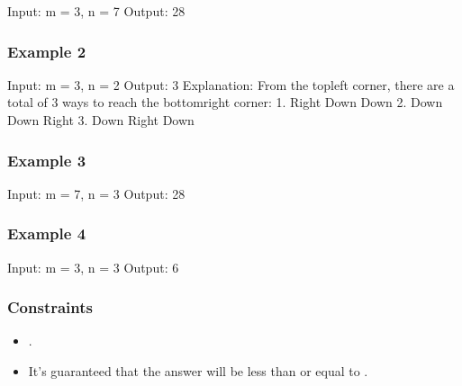 \documentclass[letterpaper,12pt,english]{book}
\begin{document}
\begin{sphinxVerbatim}[commandchars=\\\{\}]
Input: m = 3, n = 7
Output: 28
\end{sphinxVerbatim}


\subsubsection{Example 2}
\label{\detokenize{Dynamic_Programming/05_DP_62_Unique_Paths:example-2}}
\begin{sphinxVerbatim}[commandchars=\\\{\}]
Input: m = 3, n = 2
Output: 3
Explanation:
From the top\PYGZhy{}left corner, there are a total of 3 ways to reach the bottom\PYGZhy{}right corner:
1. Right \PYGZhy{}\PYGZgt{} Down \PYGZhy{}\PYGZgt{} Down
2. Down \PYGZhy{}\PYGZgt{} Down \PYGZhy{}\PYGZgt{} Right
3. Down \PYGZhy{}\PYGZgt{} Right \PYGZhy{}\PYGZgt{} Down
\end{sphinxVerbatim}


\subsubsection{Example 3}
\label{\detokenize{Dynamic_Programming/05_DP_62_Unique_Paths:example-3}}
\begin{sphinxVerbatim}[commandchars=\\\{\}]
Input: m = 7, n = 3
Output: 28
\end{sphinxVerbatim}


\subsubsection{Example 4}
\label{\detokenize{Dynamic_Programming/05_DP_62_Unique_Paths:example-4}}
\begin{sphinxVerbatim}[commandchars=\\\{\}]
Input: m = 3, n = 3
Output: 6
\end{sphinxVerbatim}


\subsubsection{Constraints}
\label{\detokenize{Dynamic_Programming/05_DP_62_Unique_Paths:constraints}}\begin{itemize}
\item {} 
\sphinxAtStartPar
{}.

\item {} 
\sphinxAtStartPar
It’s guaranteed that the answer will be less than or equal to .

\end{itemize}
\end{document}
